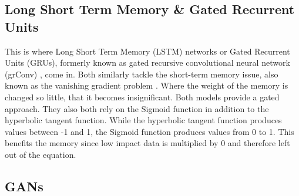 \documentclass[
	ngerman,
	ruledheaders=section,%
	class=report,%
	thesis={type=bachelor},%
	accentcolor=9c,%
	custommargins=true,%
	marginpar=false,%
	parskip=half-,%
	fontsize=11pt,%
]{tudapub}
\begin{document}
\subsection{Long Short Term Memory \& Gated Recurrent Units}

This is where Long Short Term Memory (LSTM) networks \cite{hochreiterLongShortTermMemory1997} or Gated Recurrent Units (GRUs), formerly known as gated recursive convolutional neural network (grConv) \cite{bahdanauNeuralMachineTranslation2016}, come in.
Both similarly tackle the short-term memory issue,
also known as the vanishing gradient problem \cite{hochreiterLongShortTermMemory1997}.
Where the weight of the memory is changed so little, that it becomes insignificant.
Both models provide a gated approach.
They also both rely on the Sigmoid function in addition to the hyperbolic tangent function.
While the hyperbolic tangent function produces values between -1 and 1,
the Sigmoid function produces values from 0 to 1.
This benefits the memory since low impact data is multiplied by 0 and therefore left out of the equation.



\subsection{GANs}
\end{document}
